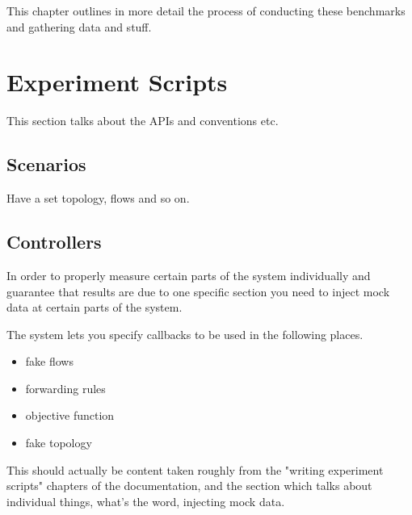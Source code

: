 This chapter outlines in more detail the process of conducting these benchmarks and gathering data and stuff.

\section{Experiment Scripts}
This section talks about the APIs and conventions etc.

\subsection{Scenarios}
Have a set topology, flows and so on.

\subsection{Controllers}
In order to properly measure certain parts of the system individually and guarantee that results are due to one specific section you need to inject mock data at certain parts of the system.

The system lets you specify callbacks to be used in the following places.

\begin{itemize}
\item fake flows
\item forwarding rules
\item objective function
\item fake topology
\end{itemize}

This should actually be content taken roughly from the "writing experiment scripts" chapters of the documentation, and the section which talks about individual things, what's the word, injecting mock data.
